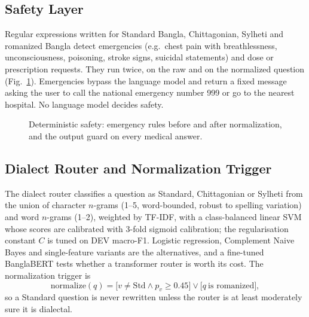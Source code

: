 \subsection{Safety Layer}
Regular expressions written for Standard Bangla, Chittagonian, Sylheti and romanized Bangla detect emergencies (e.g.\ chest pain with breathlessness, unconsciousness, poisoning, stroke signs, suicidal statements) and dose or prescription requests. They run twice, on the raw and on the normalized question (Fig.~\ref{fig:safety}). Emergencies bypass the language model and return a fixed message asking the user to call the national emergency number 999 or go to the nearest hospital. No language model decides safety.

\begin{figure}[!t]
\centering
{}
\caption{Deterministic safety: emergency rules before and after normalization, and the output guard on every medical answer.}
\label{fig:safety}
\end{figure}

\subsection{Dialect Router and Normalization Trigger}
The dialect router classifies a question as Standard, Chittagonian or Sylheti from the union of character $n$-grams (1--5, word-bounded, robust to spelling variation) and word $n$-grams (1--2), weighted by TF-IDF, with a class-balanced linear SVM whose scores are calibrated with 3-fold sigmoid calibration; the regularisation constant $C$ is tuned on DEV macro-F1. Logistic regression, Complement Naive Bayes and single-feature variants are the alternatives, and a fine-tuned BanglaBERT \cite{bhattacharjee2022banglabert} tests whether a transformer router is worth its cost. The normalization trigger is
\begin{equation}
\mathrm{normalize}(q)=\big[v\neq\mathrm{Std}\wedge p_v\ge 0.45\big]\vee\big[q\ \text{is romanized}\big],
\end{equation}
so a Standard question is never rewritten unless the router is at least moderately sure it is dialectal.

